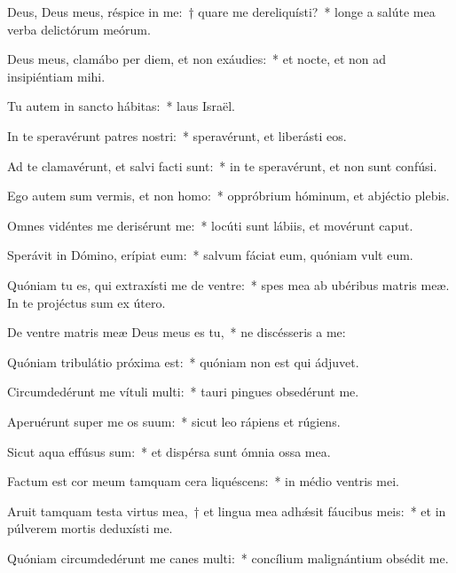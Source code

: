 \item Deus, Deus meus, réspice in me:~† quare me dereliquísti?~* longe a salúte mea verba delictórum meórum.

\item Deus meus, clamábo per diem, et non exáudies:~* et nocte, et non ad insipiéntiam mihi.

\item Tu autem in sancto hábitas:~* laus Israël.

\item In te speravérunt patres nostri:~* speravérunt, et liberásti eos.

\item Ad te clamavérunt, et salvi facti sunt:~* in te speravérunt, et non sunt confúsi.

\item Ego autem sum vermis, et non homo:~* oppróbrium hóminum, et abjéctio plebis.

\item Omnes vidéntes me derisérunt me:~* locúti sunt lábiis, et movérunt caput.

\item Sperávit in Dómino, erípiat eum:~* salvum fáciat eum, quóniam vult eum.

\item Quóniam tu es, qui extraxísti me de ventre:~* spes mea ab ubéribus matris meæ. In te projéctus sum ex útero.

\item De ventre matris meæ Deus meus es tu,~* ne discésseris a me:

\item Quóniam tribulátio próxima est:~* quóniam non est qui ádjuvet.

\item Circumdedérunt me vítuli multi:~* tauri pingues obsedérunt me.

\item Aperuérunt super me os suum:~* sicut leo rápiens et rúgiens.

\item Sicut aqua effúsus sum:~* et dispérsa sunt ómnia ossa mea.

\item Factum est cor meum tamquam cera liquéscens:~* in médio ventris mei.

\item Aruit tamquam testa virtus mea,~† et lingua mea adhǽsit fáucibus meis:~* et in púlverem mortis deduxísti me.

\item Quóniam circumdedérunt me canes multi:~* concílium malignántium obsédit me.

